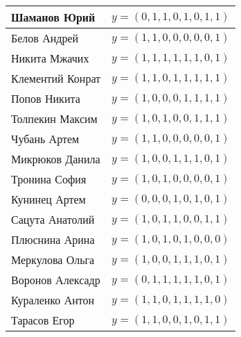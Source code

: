 \documentclass[11pt]{exam}
\theoremstyle{definition}
\begin{document}
{ 		\def\arraystretch{1.5}
 		\setlength{\tabcolsep}{15pt}
 		\begin{tabular}{l  | c }
 			Шаманов Юрий & $y = (0, 1, 1, 0, 1, 0, 1, 1)$\\ \hline
 			Белов Андрей  & $y=(1, 1, 0, 0, 0, 0, 0, 1)$\\ \hline
 			Никита Мжачих   & $y=(1, 1, 1, 1, 1, 1, 0, 1)$\\ \hline
 			Клементий Конрат  &  $y=(1, 1, 0, 1, 1, 1, 1, 1)$\\  \hline
 			Попов Никита &$y = (1, 0, 0, 0, 1, 1, 1, 1)$ \\  \hline
 			Толпекин Максим &  $y=(1, 0, 1, 0, 0, 1, 1, 1)$\\  \hline
 			Чубань Артем  &  $y= (1, 1, 0, 0, 0, 0, 0, 1)$\\  \hline
 			Микрюков Данила & $y = (1, 0, 0, 1, 1, 1, 0, 1)$\\  \hline
 			Тронина София   & $y= (1, 0, 1, 0, 0, 0, 0, 1)$\\  \hline
 			Кунинец Артем  &$y= (0, 0, 0, 1, 0, 1, 0, 1)$ \\  \hline
 			Сацута Анатолий  & $y = (1, 0, 1, 1, 0, 0, 1, 1)$\\  \hline
 			Плюснина Арина & $y= (1, 0, 1, 0, 1, 0, 0, 0)$ \\  \hline
 			Меркулова Ольга &  $y= (1, 0, 0, 1, 1, 1, 0, 1)$\\  \hline
 			Воронов Алексадр & $y = (0, 1, 1, 1, 1, 1, 0, 1) $ \\  \hline
 			Кураленко Антон & $y= (1, 1, 0, 1, 1, 1, 1, 0) $\\  \hline 
 			Тарасов Егор & $y= (1, 1, 0, 0, 1, 0, 1, 1) $\\  \hline 
 		\end{tabular}\\
 	
 		\newpage
 		
}
\end{document}
